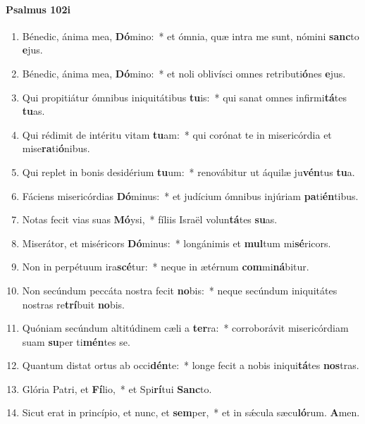 \documentclass[twoside]{article}
\begin{document}
\begin{paracol}[1]{2}
\paragraph{Psalmus 102i}
\begin{enumerate}[wide, itemsep=0mm, labelwidth=!, labelindent=0pt, label=\color{gregoriocolor}\theenumi]
\item Bénedic, ánima mea, \textbf{Dó}mino:~* et ómnia, quæ intra me sunt, nómini \textbf{sanc}to \textbf{e}jus.
\item Bénedic, ánima mea, \textbf{Dó}mino:~* et noli oblivísci omnes retributi\textbf{ó}nes \textbf{e}jus.
\item Qui propitiátur ómnibus iniquitátibus \textbf{tu}is:~* qui sanat omnes infirmi\textbf{tá}tes \textbf{tu}as.
\item Qui rédimit de intéritu vitam \textbf{tu}am:~* qui corónat te in misericórdia et mise\textbf{ra}ti\textbf{ó}nibus.
\item Qui replet in bonis desidérium \textbf{tu}um:~* renovábitur ut áquilæ ju\textbf{vén}tus \textbf{tu}a.
\item Fáciens misericórdias \textbf{Dó}minus:~* et judícium ómnibus injúriam \textbf{pa}ti\textbf{én}tibus.
\item Notas fecit vias suas \textbf{Mó}ysi,~* fíliis Israël volun\textbf{tá}tes \textbf{su}as.
\item Miserátor, et miséricors \textbf{Dó}minus:~* longánimis et \textbf{mul}tum mi\textbf{sé}ricors.
\item Non in perpétuum ira\textbf{scé}tur:~* neque in ætérnum \textbf{com}mi\textbf{ná}bitur.
\item Non secúndum peccáta nostra fecit \textbf{no}bis:~* neque secúndum iniquitátes nostras re\textbf{trí}buit \textbf{no}bis.
\item Quóniam secúndum altitúdinem cæli a \textbf{ter}ra:~* corroborávit misericórdiam suam \textbf{su}per ti\textbf{mén}tes se.
\item Quantum distat ortus ab occi\textbf{dén}te:~* longe fecit a nobis iniqui\textbf{tá}tes \textbf{nos}tras.
\item Glória Patri, et \textbf{Fí}lio,~* et Spi\textbf{rí}tui \textbf{Sanc}to.
\item Sicut erat in princípio, et nunc, et \textbf{sem}per,~* et in sǽcula sæcu\textbf{ló}rum. \textbf{A}men.
\end{enumerate}
\switchcolumn


\end{paracol}
\end{document}
